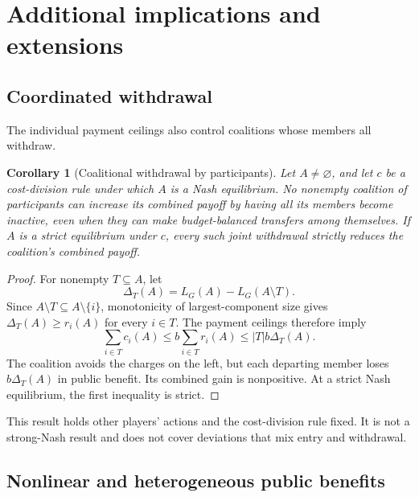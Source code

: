\documentclass[preprint,12pt,authoryear]{elsarticle}
\newcommand{\LCC}{L}
\newtheorem{corollary}{Corollary}
\begin{document}
\section{Additional implications and extensions}
\label{app:extensions}

\subsection{Coordinated withdrawal}

The individual payment ceilings also control coalitions whose members all
withdraw.

\begin{corollary}[Coalitional withdrawal by participants]
\label{cor:coalition-withdrawal}
Let \(A\ne\varnothing\), and let \(c\) be a cost-division rule under which \(A\)
is a Nash equilibrium. No nonempty coalition of participants can increase its
combined payoff by having all its members become inactive, even when they can
make budget-balanced transfers among themselves. If \(A\) is a strict
equilibrium under \(c\), every such joint withdrawal strictly reduces the
coalition's combined payoff.
\end{corollary}

\begin{proof}
For nonempty \(T\subseteq A\), let
\[
 \Delta_T(A)=\LCC_G(A)-\LCC_G(A\setminus T).
\]
Since \(A\setminus T\subseteq A\setminus\{i\}\), monotonicity of
largest-component size gives \(\Delta_T(A)\geq r_i(A)\) for every \(i\in T\).
The payment ceilings therefore imply
\[
 \sum_{i\in T}c_i(A)
 \leq b\sum_{i\in T}r_i(A)
 \leq |T|b\Delta_T(A).
\]
The coalition avoids the charges on the left, but each departing member loses
\(b\Delta_T(A)\) in public benefit. Its combined gain is nonpositive. At a
strict Nash equilibrium, the first inequality is strict.
\end{proof}

This result holds other players' actions and the cost-division rule fixed. It is
not a strong-Nash result and does not cover deviations that mix entry and
withdrawal.

\subsection{Nonlinear and heterogeneous public benefits}
\end{document}

